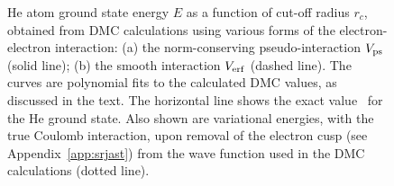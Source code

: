 \begin{figure}[tb]
\begin{center}
  \leavevmode
  \vspace{0.5cm}
  \caption{
    He atom ground state energy $E$ as a function of cut-off radius $r_c$, 
    obtained from DMC calculations using various 
    forms of the electron-electron interaction:
    (a) the norm-conserving pseudo-interaction $V_{\rm ps}$ 
        (solid line);
    (b) the smooth interaction $V_{\rm erf}$ 
        (dashed line).
    The curves are polynomial fits to the calculated DMC values, 
    as discussed in the text.
    The horizontal line shows the exact value~\protect\cite{Davidson} for the He ground state.
    Also shown are variational energies, with the true Coulomb interaction,
    upon removal of the electron cusp (see Appendix~\protect\ref{app:srjast})
    from the wave function used in the DMC calculations (dotted line).
  }
  \label{fig:HegsE}
\end{center}
\end{figure}

